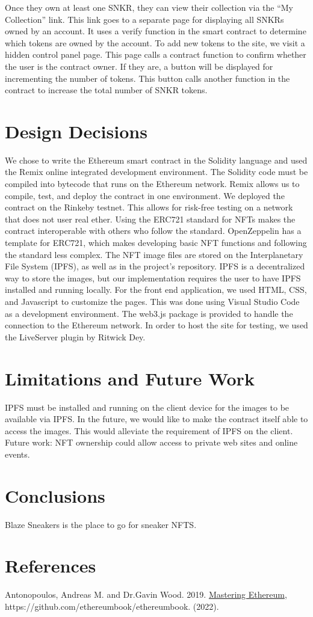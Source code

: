 \documentclass{article}
\begin{document}
    Once they own at least one SNKR, they can view their collection via the ``My Collection'' link.
    This link goes to a separate page for displaying all SNKRs owned by an account.
    It uses a verify function in the smart contract to determine which tokens are owned by the account.
    \newline
    To add new tokens to the site, we visit a hidden control panel page. 
    This page calls a contract function to confirm whether the user is the contract owner.
    If they are, a button will be displayed for incrementing the number of tokens.
    This button calls another function in the contract to increase the total number of SNKR tokens.
    
    
\section{Design Decisions}
    We chose to write the Ethereum smart contract in the Solidity language and used the Remix online integrated development environment.
    The Solidity code must be compiled into bytecode that runs on the Ethereum network.
    Remix allows us to compile, test, and deploy the contract in one environment.
    We deployed the contract on the Rinkeby testnet. This allows for risk-free testing on a network that does not user real ether.
    \newline
    Using the ERC721 standard for NFTs makes the contract interoperable with others who follow the standard.
    OpenZeppelin has a template for ERC721, which makes developing basic NFT functions and following the standard less complex.
    \newline
    The NFT image files are stored on the Interplanetary File System (IPFS), as well as in the project's repository.
    IPFS is a decentralized way to store the images, but our implementation requires the user to have IPFS installed and running locally.
    \newline
    For the front end application, we used HTML, CSS, and Javascript to customize the pages.
    This was done using Visual Studio Code as a development environment.
    The web3.js package is provided to handle the connection to the Ethereum network.
    In order to host the site for testing, we used the LiveServer plugin by Ritwick Dey.

\section{Limitations and Future Work}
    IPFS must be installed and running on the client device for the images to be available via IPFS. 
    In the future, we would like to make the contract itself able to access the images.
    This would alleviate the requirement of IPFS on the client.
    Future work: NFT ownership could allow access to private web sites and online events.

\section{Conclusions}
    Blaze Sneakers is the place to go for sneaker NFTS.

\section{References}
Antonopoulos, Andreas M. and Dr.Gavin Wood. 2019. \underline{Mastering Ethereum}, 
\newline \indent https://github.com/ethereumbook/ethereumbook. (2022).
    
\end{document}
